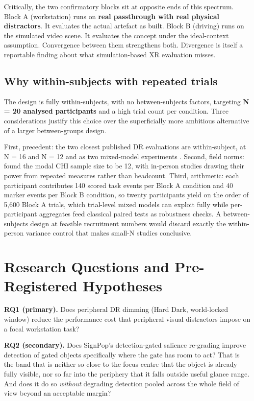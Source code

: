Critically, the two confirmatory blocks sit at opposite ends of this spectrum. Block A (workstation)
runs on \textbf{real passthrough with real physical distractors}. It evaluates the actual artefact as
built. Block B (driving) runs on the simulated video scene. It evaluates the concept under the
ideal-context assumption. Convergence between them strengthens both. Divergence is itself a
reportable finding about what simulation-based XR evaluation misses.

\subsection{Why within-subjects with repeated trials}

The design is fully within-subjects, with no between-subjects factors, targeting \textbf{N = 20 analysed
participants} and a high trial count per condition. Three considerations justify this choice over the
superficially more ambitious alternative of a larger between-groups design.

First, precedent: the two closest published DR evaluations are within-subject, at N = 16 and N = 12
\citep{cheng2022} and as two mixed-model experiments \citep{mclaughlin2025}. Second, field
norms: \citet{caine2016} found the modal CHI sample size to be 12, with in-person studies drawing their
power from repeated measures rather than headcount. Third, arithmetic: each participant contributes
140 scored task events per Block A condition and 40 marker events per Block B condition, so twenty
participants yield on the order of 5,600 Block A trials, which trial-level mixed models can exploit
fully while per-participant aggregates feed classical paired tests as robustness checks. A
between-subjects design at feasible recruitment numbers would discard exactly the within-person
variance control that makes small-N studies conclusive.

\section{Research Questions and Pre-Registered Hypotheses}

\textbf{RQ1 (primary).} Does peripheral DR dimming (Hard Dark, world-locked window) reduce the performance
cost that peripheral visual distractors impose on a focal workstation task?

\textbf{RQ2 (secondary).} Does SignPop's detection-gated salience re-grading improve detection of
gated objects specifically where the gate has room to act? That is the band that is neither so close
to the focus centre that the object is already fully visible, nor so far into the periphery that it
falls outside useful glance range. And does it do so \textit{without} degrading detection pooled
across the whole field of view beyond an acceptable margin?

